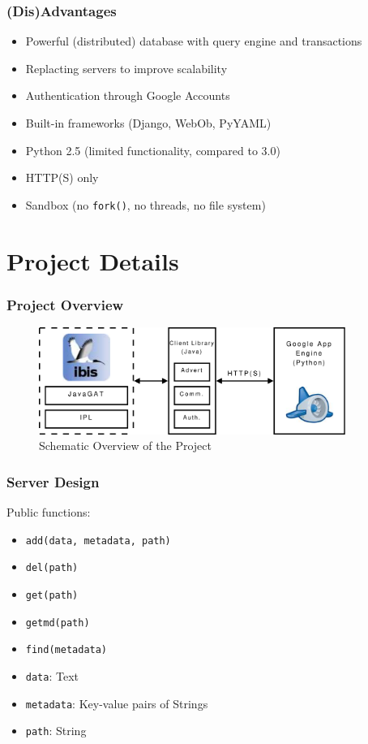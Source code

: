 \documentclass{beamer}
\begin{document}
\frame
{
	\frametitle{(Dis)Advantages}
	\begin{itemize}
		\item <1->Powerful (distributed) database with query engine and
			transactions
		\item <1->Replacting servers to improve scalability 
		\item <1->Authentication through Google Accounts
		\item <1->Built-in frameworks (Django, WebOb, PyYAML)
	\end{itemize}

	\begin{itemize}
		\item <2->Python 2.5 (limited functionality, compared to 3.0)
		\item <2->HTTP(S) only
		\item <2->Sandbox (no \texttt{fork()}, no threads, no file system)
	\end{itemize}
}

\section{Project Details}
\frame
{
	\frametitle{Project Overview}
	\begin{figure}
	\begin{center}
	\includegraphics[width=10cm]{proj_design.pdf} 
	\caption{Schematic Overview of the Project}
	\end{center}
	\end{figure}
}

\frame
{
	\frametitle{Server Design}
	Public functions:
	\begin{itemize}
		\item <1->\texttt{add(data, metadata, path)}
		\item <1->\texttt{del(path)}
		\item <1->\texttt{get(path)}
		\item <1->\texttt{getmd(path)}
		\item <1->\texttt{find(metadata)}
	\end{itemize}
	\begin{itemize}
		\item <2->\texttt{data}: Text
		\item <2->\texttt{metadata}: Key-value pairs of Strings
		\item <2->\texttt{path}: String
	\end{itemize}
}
\end{document}
